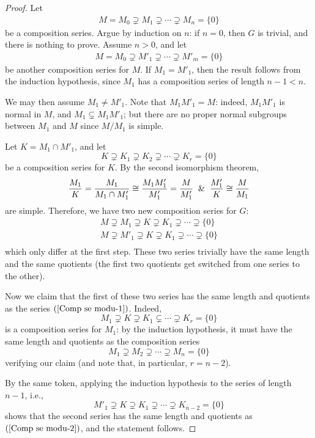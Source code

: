 \begin{proof}
Let 
\begin{align}\label{Comp se modu-1}
M=M_0\supsetneq M_1\supsetneq\cdots\supsetneq M_n=\{0\}
\end{align}
be a composition series. Argue by induction on $n$: if $n=0$, then $G$ is trivial, and there is nothing to prove. Assume $n>0$, and let
\begin{align}\label{Comp se modu-2}
M=M_0\supsetneq M'_1\supsetneq\cdots\supsetneq M'_m=\{0\}
\end{align}
be another composition series for $M$. If $M_1=M'_1$, then the result follows from the induction hypothesis, since $M_1$ has a composition series of length $n-1<n$.\par
We may then assume $M_1\neq M'_1$. Note that $M_1M'_1=M$: indeed, $M_1M'_1$ is normal in $M$, and $M_1\subsetneq M_1M'_1$; but there are no proper normal subgroups between $M_1$ and $M$ since $M/M_1$ is simple.\par
Let $K=M_1\cap M'_1$, and let
\[K\supsetneq K_1\supsetneq K_2\supsetneq\cdots\supsetneq K_r=\{0\}\]
be a composition series for $K$. By the second isomorphism theorem,
\[\dfrac{M_1}{K}=\dfrac{M_1}{M_1\cap M'_1}\cong \dfrac{M_1M'_1}{M'_1}=\dfrac{M}{M'_1}\And \dfrac{M'_1}{K}\cong\dfrac{M}{M_1}\]
are simple. Therefore, we have two new composition series for $G$:
\[\begin{array}{l}
M\supsetneq M_1\supsetneq  K\supsetneq K_1\supsetneq \cdots\supsetneq \{0\}\\
M\supsetneq M'_1\supsetneq  K\supsetneq K_1\supsetneq \cdots\supsetneq \{0\}\\
\end{array}\]
which only differ at the first step. These two series trivially have the same length and the same quotients (the first two quotients get switched from one series to the
other).\par
Now we claim that the first of these two series has the same length and quotients
as the series $(\ref{Comp se modu-1})$. Indeed,
\[M_1\supsetneq K\supsetneq K_1 \subsetneq\cdots\supsetneq K_r=\{0\}\]
is a composition series for $M_1$: by the induction hypothesis, it must have the same length and quotients as the composition series
\[M_1\supsetneq M_2\supsetneq \cdots\supsetneq M_n=\{0\}\]
verifying our claim (and note that, in particular, $r=n-2$).\par
By the same token, applying the induction hypothesis to the series of length $n-1$, i.e.,
\[M'_1\supsetneq K\supsetneq K_1\supsetneq\cdots\supsetneq K_{n-2}=\{0\}\]
shows that the second series has the same length and quotients as $(\ref{Comp se modu-2})$, and the
statement follows.
\end{proof}
